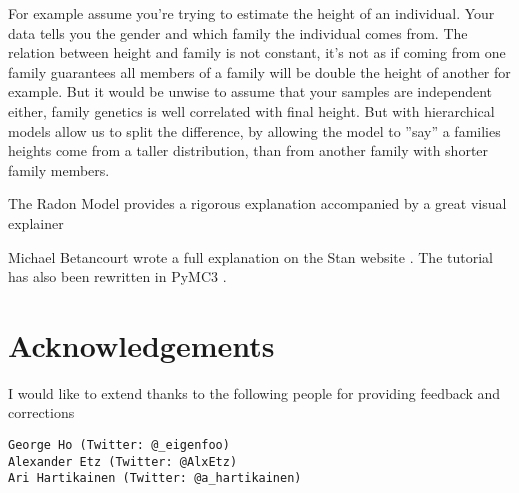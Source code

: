 For example assume you're trying to estimate the height of an individual. Your data tells you the gender and which family the individual comes from. The relation between height and family is not constant, it's not as if coming from one family guarantees all members of a family will be double the height of another for example. But it would be unwise to assume that your samples are independent either, family genetics is well correlated with final height. But with hierarchical models allow us to split the difference, by allowing the model to ''say'' a families heights come from a taller distribution, than from another family with shorter family members.

The Radon Model \cite{PyMC3multilevel2019} provides a rigorous explanation accompanied by a great visual explainer



Michael Betancourt wrote a full explanation on the Stan website \cite{MichaelBetancourtdivergence2017}. The tutorial has also been rewritten in PyMC3 \cite{PyMC3Divergences2019}.


\section{Acknowledgements}

I would like to extend thanks to the following people for providing feedback and corrections
\begin{lstlisting}
George Ho (Twitter: @_eigenfoo)
Alexander Etz (Twitter: @AlxEtz)
Ari Hartikainen (Twitter: @a_hartikainen)
\end{lstlisting}

